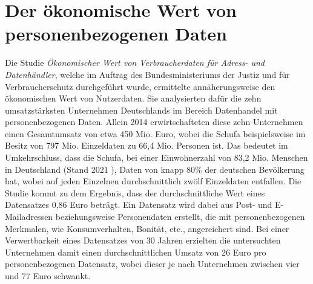 \section{Der ökonomische Wert von personenbezogenen Daten} \label{oekonomischerWert}

Die Studie \textit{Ökonomischer Wert von Verbraucherdaten für Adress- und Datenhändler}, welche im Auftrag des Bundesministeriums der Justiz und für Verbraucherschutz durchgeführt wurde, ermittelte annäherungsweise den ökonomischen Wert von Nutzerdaten. Sie analysierten dafür die zehn umsatzstärksten Unternehmen Deutschlands im Bereich Datenhandel mit personenbezogenen Daten. Allein 2014 erwirtschafteten diese zehn Unternehmen einen Gesamtumsatz von etwa 450 Mio. Euro, wobei die Schufa beispielsweise im Besitz von 797 Mio. Einzeldaten zu 66,4 Mio. Personen ist. Das bedeutet im Umkehrschluss, dass die Schufa, bei einer Einwohnerzahl von 83,2 Mio. Menschen in Deutschland (Stand 2021 \cite{einwohnerzahl_2021}), Daten von knapp 80\% der deutschen Bevölkerung hat, wobei auf jeden Einzelnen durchschnittlich zwölf Einzeldaten entfallen. Die Studie kommt zu dem Ergebnis, dass der durchschnittliche Wert eines Datensatzes 0,86 Euro beträgt. Ein Datensatz wird dabei aus Post- und E-Mailadressen beziehungsweise Personendaten erstellt, die mit personenbezogenen Merkmalen, wie Konsumverhalten, Bonität, etc., angereichert sind. Bei einer Verwertbarkeit eines Datensatzes von 30 Jahren erzielten die untersuchten Unternehmen damit einen durchschnittlichen Umsatz von 26 Euro pro personenbezogenen Datensatz, wobei dieser je nach Unternehmen zwischen vier und 77 Euro schwankt. \cite{Wert_der_Daten_2017}